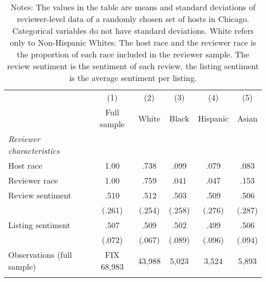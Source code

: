 
{
	\begin{longtable}{l*{5}{c}}
		\caption{Summary Statistics by Race: Reviewer Characteristics}\\
		\hline
		&\multicolumn{1}{c}{(1)}&\multicolumn{1}{c}{(2)}&\multicolumn{1}{c}{(3)}&\multicolumn{1}{c}{(4)}&\multicolumn{1}{c}{(5)}\\
		&\multicolumn{1}{c}{Full sample}&\multicolumn{1}{c}{White}&\multicolumn{1}{c}{Black}&\multicolumn{1}{c}{Hispanic}&\multicolumn{1}{c}{Asian}\\
		\hline\hline                

		\textit{Reviewer characteristics} \\
		\hline
		Host race            &      1.00 &      .738&       .099         &      .079    &	.083     \\
		[1em]
		Reviewer race            &      1.00		&      .759	&       .041         &      .047    &	.153     \\
		[1em]
		Review sentiment            &      .510	&      .512&       .503         &      .509    &	.506     \\
		&     (.261)         &     (.254)         &     (.258)         &     (.276)         &		(.287)\\
		[1em]
		Listing sentiment            &      .507&      .509&       .502         &      .499    &	.506     \\
		&     (.072)         &     (.067)         &     (.089)         &     (.096)         &		(.094)\\
		
		\hline
		Observations (full sample)     & FIX 68,983   &       43,988         &       5,023         &       3,524         &       5,893         \\
		\hline\hline
		\caption*{Notes: The values in the table are means and standard deviations of reviewer-level data of a randomly chosen set of hosts in Chicago. Categorical variables do not have standard deviations. White refers only to Non-Hispanic Whites. The host race and the reviewer race is the proportion of each race included in the reviewer sample. The review sentiment is the sentiment of each review, the listing sentiment is the average sentiment per listing.}
		
	\end{longtable}
}

